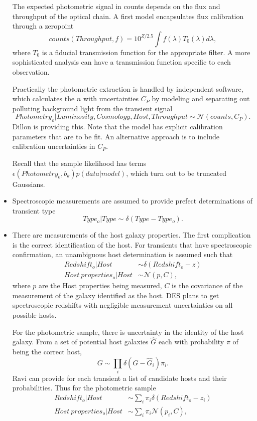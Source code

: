 \documentclass[preprint,3p]{elsarticle}
\begin{document}
\begin{itemize}
The expected photometric signal in counts depends on the flux and throughput of the
optical chain.  A first model encapsulates flux calibration through a zeropoint
\begin{equation}
counts(Throughput, f) = 10^{Z/2.5} \int  f(\lambda) T_0(\lambda)d\lambda,
\end{equation}
where $T_0$ is a fiducial transmission function for the appropriate filter.  A more sophisticated
analysis can have a transmission function specific to each observation.

Practically the photometric extraction is handled by independent software, which calculates
the $n$ with uncertainties $C_P$
by modeling and separating out polluting background light from the transient
signal
\begin{equation}
Photometry_o |  Luminosity, Cosmology,Host,Throughput \sim \mathcal{N}(counts,C_P).
\end{equation}
Dillon is providing this.
Note that the model has explicit calibration parameters that are to be fit.  An alternative
approach is to include calibration uncertainties in $C_P$.

Recall that the sample likelihood has terms
$\epsilon(Photometry_o, b_k)p(data| model)$, which turn out to be truncated Gaussians.

\item Spectroscopic measurements are assumed
to provide prefect determinations of transient type
\begin{equation}
Type_o | Type  \sim \delta(Type-Type_o).
\end{equation}
\item There are measurements of the host galaxy properties.
The first complication is
the correct identification of the host.  For transients that have spectroscopic
confirmation, an unambiguous host determination is assumed such that
\begin{align}
Redshift_o  | Host & \sim \delta(Redshift_o- z)\\
Host~properties_o  | Host & \sim \mathcal{N}(p, C),
\end{align}
where $p$ are the Host properties being measured,
$C$ is the covariance of the measurement of the galaxy identified as the host.
DES plans to get spectroscopic redshifts with negligible measurement uncertainties on all
possible hosts.

For the photometric sample, there is uncertainty in the identity of the host galaxy.
From a set of potential host galaxies $\hat{G}$ each with probability $\pi$ of being the correct host,
\begin{equation}
G \sim \prod_i \delta(G-\hat{G}_i) \pi_i.
\end{equation}
Ravi can provide for each transient a list of candidate hosts and their probabilities.
Thus for the photometric sample
\begin{align}
Redshift_o  | Host &  \sim \sum_i \pi_i \delta(Redshift_o- z_i)\\
Host~properties_o  | Host & \sim  \sum_i \pi_i \mathcal{N}(p_i, C),
\end{align}
\end{itemize}
\end{document}

